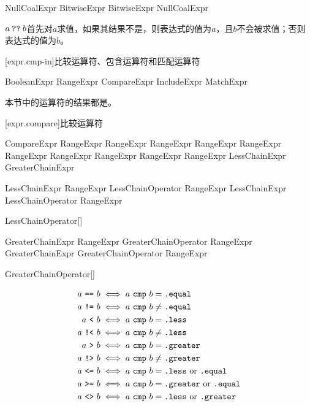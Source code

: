 \begin{bnf}{NullCoalExpr}
    BitwiseExpr \br
    BitwiseExpr  NullCoalExpr
\end{bnf}

\pnum
$a\mathbin{\texttt{??}}b$首先对$a$求值，如果其结果不是，则表达式的值为$a$，且$b$不会被求值；否则表达式的值为$b$。

[expr.cmp-in]{比较运算符、包含运算符和匹配运算符}

\begin{bnf}{BooleanExpr}
    RangeExpr \br
    CompareExpr \br
    IncludeExpr \br
    MatchExpr
\end{bnf}

\pnum
本节中的运算符的结果都是。

[expr.compare]{比较运算符}

\begin{bnf}{CompareExpr}
    RangeExpr \terminal{!=} RangeExpr \br
    RangeExpr \terminal{!<} RangeExpr \br
    RangeExpr \terminal{!>} RangeExpr \br
    RangeExpr \terminal{<>} RangeExpr \br
    RangeExpr  RangeExpr \br
    LessChainExpr \br
    GreaterChainExpr
\end{bnf}

\begin{bnf}{LessChainExpr}
    RangeExpr LessChainOperator RangeExpr \br
    LessChainExpr LessChainOperator RangeExpr
\end{bnf}

\begin{bnf}{LessChainOperator}[\oneof]
    \terminal{< == <=}
\end{bnf}

\begin{bnf}{GreaterChainExpr}
    RangeExpr GreaterChainOperator RangeExpr \br
    GreaterChainExpr GreaterChainOperator RangeExpr
\end{bnf}

\begin{bnf}{GreaterChainOperator}[\oneof]
    \terminal{> == >=}
\end{bnf}

\begin{align*}
a\ \tcode{==}\ b &\iff a\ \tcode{cmp}\ b = \tcode{.equal} \\
a\ \tcode{!=}\ b &\iff a\ \tcode{cmp}\ b \ne \tcode{.equal} \\
a\ \tcode{<}\ b &\iff a\ \tcode{cmp}\ b = \tcode{.less} \\
a\ \tcode{!<}\ b &\iff a\ \tcode{cmp}\ b \ne \tcode{.less} \\
a\ \tcode{>}\ b &\iff a\ \tcode{cmp}\ b = \tcode{.greater} \\
a\ \tcode{!>}\ b &\iff a\ \tcode{cmp}\ b \ne \tcode{.greater} \\
a\ \tcode{<=}\ b &\iff a\ \tcode{cmp}\ b = \tcode{.less}\ \mathrm{or} \ \tcode{.equal} \\
a\ \tcode{>=}\ b &\iff a\ \tcode{cmp}\ b = \tcode{.greater}\ \mathrm{or} \ \tcode{.equal} \\
a\ \tcode{<>}\ b &\iff a\ \tcode{cmp}\ b = \tcode{.less}\ \mathrm{or} \ \tcode{.greater}
\end{align*}


